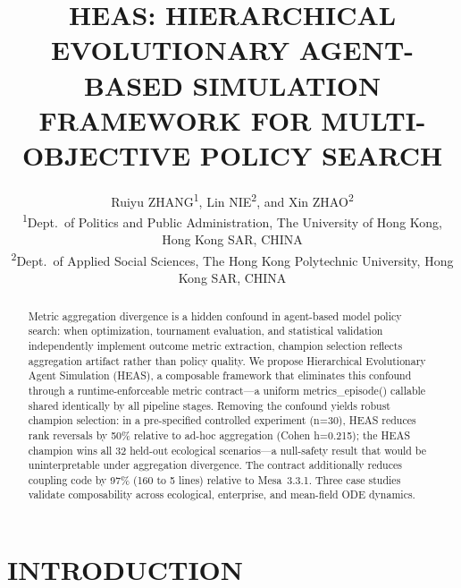 \documentclass{wscpaperproc}
\begin{document}

\title{HEAS: HIERARCHICAL EVOLUTIONARY AGENT-BASED SIMULATION FRAMEWORK
       FOR MULTI-OBJECTIVE POLICY SEARCH}

\author{\begin{center}Ruiyu ZHANG\textsuperscript{1}, Lin NIE\textsuperscript{2}, and Xin ZHAO\textsuperscript{2}\\
[11pt]
\textsuperscript{1}Dept.~of Politics and Public Administration, The University of Hong Kong, Hong Kong SAR, CHINA\\
\textsuperscript{2}Dept.~of Applied Social Sciences, The Hong Kong Polytechnic University, Hong Kong SAR, CHINA\end{center}
}

\maketitle

\vspace{-12pt}

\begin{abstract}
Metric aggregation divergence is a hidden confound in agent-based model policy
search: when optimization, tournament evaluation, and statistical validation
independently implement outcome metric extraction, champion selection reflects
aggregation artifact rather than policy quality. We propose Hierarchical Evolutionary Agent Simulation (HEAS), a composable
framework that eliminates this confound through a runtime-enforceable metric
contract---a uniform metrics\_episode() callable shared identically by all
pipeline stages. Removing the confound yields robust champion selection: in a
pre-specified controlled experiment (n=30), HEAS reduces rank reversals by 50\%
relative to ad-hoc aggregation (Cohen h=0.215); the HEAS champion wins all 32
held-out ecological scenarios---a null-safety result that would be
uninterpretable under aggregation divergence. The contract additionally reduces
coupling code by 97\% (160 to 5 lines) relative to Mesa~3.3.1. Three case
studies validate composability across ecological, enterprise, and mean-field ODE
dynamics.
\end{abstract}

\section{INTRODUCTION}
\end{document}
